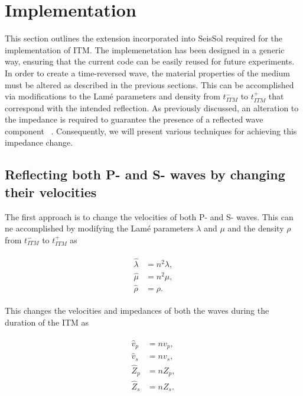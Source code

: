 \section{Implementation}\label{section:Implementation}

This section outlines the extension incorporated into SeisSol required for the implementation of \ac{ITM}. The implemenetation has been designed in a generic way,
ensuring that the current code can be easily reused for future experiments. \\

In order to create a time-reversed wave, the material properties of the medium must be altered as described in the previous sections. This can be accomplished via
modifications to the Lam\'{e} parameters and density from $t_{ITM}^-$ to $t_{ITM}^+$ that correspond with the intended reflection. As previously discussed, an alteration
to the impedance is required to guarantee the presence of a reflected wave component ~\parencite[Sec 9.8]{leveque_2002}. Consequently, we will present various techniques
for achieving this impedance change. \\

\subsection{Reflecting both P- and S- waves by changing their velocities}

The first approach is to change the velocities of both P- and S- waves. This can ne accomplished by modifying the Lam\'{e} parameters $\lambda$ and $\mu$ and the density $\rho$ from $t_{ITM}^-$ to $t_{ITM}^+$ as

\begin{align}
    \begin{split}
        \hat{\lambda} &= n^2 \lambda , \\
        \hat{\mu} &= n^2 \mu ,\\
        \hat{\rho} &= \rho .
    \end{split}
\end{align}

This changes the velocities and impedances of both the waves during the duration of the \ac{ITM} as

\begin{align}
    \begin{split}
        \hat{v}_p &= n v_p ,\\
        \hat{v}_s &= n v_s ,\\
        \hat{Z}_p &= n Z_p ,\\
        \hat{Z}_s &= n Z_s .
    \end{split}
\end{align}

